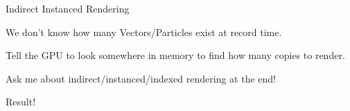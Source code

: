 \begin{frame}{Indirect Instanced Rendering}
{\begin{tikzpicture}[
    scale=0.9, every node/.style={scale=0.9},
fixedrect/.style={rectangle,draw,minimum height=4em,anchor=west,text width=2cm,align=center},
]


    \end{tikzpicture}
    }

    \vfill\null
    \begin{wideitemize}
        \item We don't know how many Vectors/Particles exist at record time.
        \item Tell the GPU to look somewhere in memory to find how many copies to render.
    \end{wideitemize}
    \vfill\null
    \begin{center}
        Ask me about indirect/instanced/indexed rendering at the end!
    \end{center}
\end{frame}


\begin{frame}{Result!}
\end{frame}